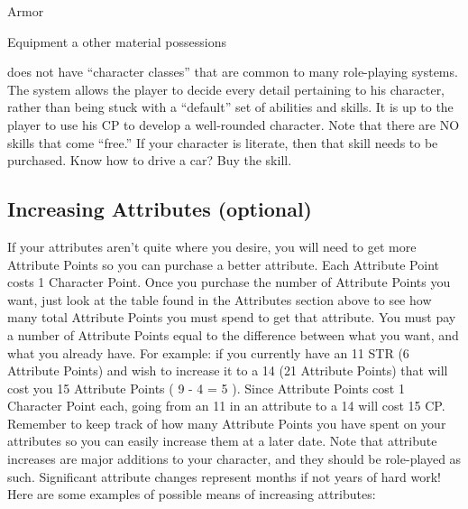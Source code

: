 \documentclass[twoside]{book}
\begin{document}
                       Armor 
                      
                    
                    
                       Equipment 
                        a other material possessions 
                    
                  
                  
                
            \APATHY{}  does not have “character
              classes” that are common to many role-playing
              systems. The \APATHY{}  system allows the player to decide
              every detail pertaining to his character, rather than being
              stuck with a “default” set of abilities and
              skills. It is up to the player to use his CP to develop a
              well-rounded character. Note that there are NO skills that
              come “free.” If your character is literate,
              then that skill needs to be purchased. Know how to drive a
              car? Buy the skill.
            
\subsection{Increasing Attributes (optional)}
     If your attributes aren’t quite where you
               desire, you will need to get more Attribute Points so you
               can purchase a better attribute. Each Attribute Point
               costs 1 Character Point. Once you purchase the number of
               Attribute Points you want, just look at the table found in
               the Attributes section above to see how many total
               Attribute Points you must spend to get that attribute.
                You must pay a number of Attribute Points equal to
              the difference between what you want, and what you already
              have. For example: if you currently have an 11 STR (6
              Attribute Points) and wish to increase it to a 14 (21
              Attribute Points) that will cost you 15 Attribute Points (
               9  -  4  =
               5  ). Since Attribute Points cost
              1 Character Point each, going from an 11 in an attribute to
              a 14 will cost 15 CP.
             Remember to keep track of how many Attribute Points
               you have spent on your attributes so you can easily
               increase them at a later date.  Note that attribute increases are major additions to
               your character, and they should be role-played as such.
               Significant attribute changes represent months if not
               years of hard work! Here are some examples of possible
               means of increasing attributes:   
                
\end{document}
